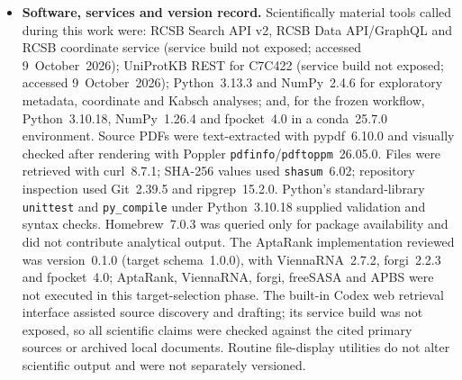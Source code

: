\begin{itemize}
  \item \textbf{Software, services and version record.}  Scientifically
  material tools called during this work were: RCSB Search API v2, RCSB Data
  API/GraphQL and RCSB coordinate service (service build not exposed; accessed
  9~October~2026); UniProtKB REST for C7C422 (service build not exposed;
  accessed 9~October~2026); Python~3.13.3 and NumPy~2.4.6 for exploratory
  metadata, coordinate and Kabsch analyses; and, for the frozen workflow,
  Python~3.10.18, NumPy~1.26.4 and fpocket~4.0 in a conda~25.7.0 environment.
  Source PDFs were text-extracted with pypdf~6.10.0 and visually checked after
  rendering with Poppler \texttt{pdfinfo}/\texttt{pdftoppm}~26.05.0.  Files
  were retrieved with curl~8.7.1; SHA-256 values used
  \texttt{shasum}~6.02; repository inspection used Git~2.39.5 and
  ripgrep~15.2.0.  Python's standard-library \texttt{unittest} and
  \texttt{py\_compile} under Python~3.10.18 supplied validation and syntax
  checks.  Homebrew~7.0.3 was queried only for package availability and did not
  contribute analytical output.  The AptaRank implementation reviewed was
  version~0.1.0 (target schema~1.0.0), with ViennaRNA~2.7.2,
  forgi~2.2.3 and fpocket~4.0; AptaRank, ViennaRNA, forgi, freeSASA and APBS
  were not executed in this target-selection phase.  The built-in Codex web
  retrieval interface assisted source discovery and drafting; its service
  build was not exposed, so all scientific claims were checked against the
  cited primary sources or archived local documents.  Routine file-display
  utilities do not alter scientific output and were not separately versioned.
\end{itemize}

